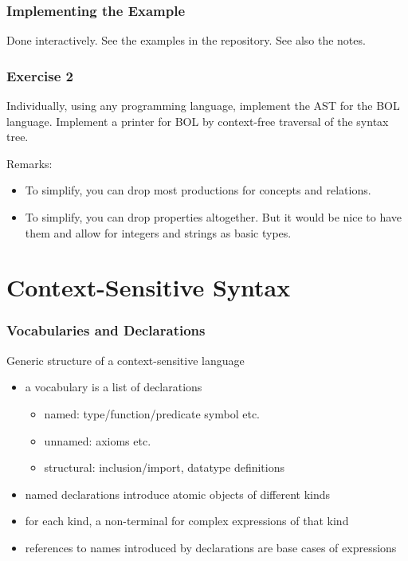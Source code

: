\begin{frame}\frametitle{Implementing the Example}
Done interactively. See the examples in the repository. See also the notes.
\end{frame}

\begin{frame}\frametitle{Exercise 2}
Individually, using any programming language, implement the AST for the BOL language.
Implement a printer for BOL by context-free traversal of the syntax tree.

Remarks:
\begin{itemize}
\item To simplify, you can drop most productions for concepts and relations.
\item To simplify, you can drop properties altogether. But it would be nice to have them and allow for integers and strings as basic types.
\end{itemize}
\end{frame}

\section{Context-Sensitive Syntax}

\begin{frame}\frametitle{Vocabularies and Declarations}
Generic structure of a context-sensitive language
\begin{itemize}
 \item a vocabulary is a list of declarations
  \begin{itemize}
  \item named: type/function/predicate symbol etc.
  \item unnamed: axioms etc.
  \item structural: inclusion/import, datatype definitions
  \end{itemize}
 \item named declarations introduce atomic objects of different kinds
 \item for each kind, a non-terminal for complex expressions of that kind
 \item references to names introduced by declarations are base cases of expressions
\end{itemize}
\end{frame}

